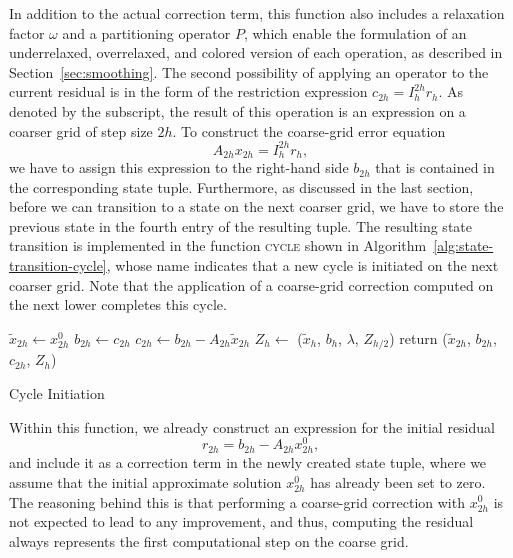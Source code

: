 In addition to the actual correction term, this function also includes a relaxation factor $\omega$ and a partitioning operator $P$, which enable the formulation of an underrelaxed, overrelaxed, and colored version of each operation, as described in Section~\ref{sec:smoothing}.
The second possibility of applying an operator to the current residual is in the form of the restriction expression $c_{2h} = I_{h}^{2h} r_h$.
As denoted by the subscript, the result of this operation is an expression on a coarser grid of step size $2h$.
To construct the coarse-grid error equation 
\begin{equation*}
A_{2h} x_{2h} = I_{h}^{2h} r_h,
\end{equation*} 
we have to assign this expression to the right-hand side $b_{2h}$ that is contained in the corresponding state tuple.
Furthermore, as discussed in the last section, before we can transition to a state on the next coarser grid, we have to store the previous state in the fourth entry of the resulting tuple.
The resulting state transition is implemented in the function \textsc{cycle} shown in Algorithm~\ref{alg:state-transition-cycle}, whose name indicates that a new cycle is initiated on the next coarser grid.
Note that the application of a coarse-grid correction computed on the next lower completes this cycle. 
\begin{algorithm}
	\begin{algorithmic}
		\State $\tilde{x}_{2h} \gets x_{2h}^0$ 
		\State $b_{2h} \gets c_{2h}$
		\State $c_{2h} \gets b_{2h} - A_{2h} \tilde{x}_{2h}$ 
		\State $Z_h \gets$ ($\tilde{x}_{h}$, $b_{h}$, $\lambda$, $Z_{h/2}$)
		\State return ($\tilde{x}_{2h}$, $b_{2h}$, $c_{2h}$, $Z_h$)
	\EndFunction
	\end{algorithmic}
 \caption{Cycle Initiation}
\label{alg:state-transition-cycle}
\end{algorithm}
Within this function, we already construct an expression for the initial residual
\begin{equation*}
	r_{2h} = b_{2h} - A_{2h} x_{2h}^0,
\end{equation*} 
and include it as a correction term in the newly created state tuple, where we assume that the initial approximate solution $x^0_{2h}$ has already been set to zero.
The reasoning behind this is that performing a coarse-grid correction with $x^0_{2h}$ is not expected to lead to any improvement, and thus, computing the residual always represents the first computational step on the coarse grid.

